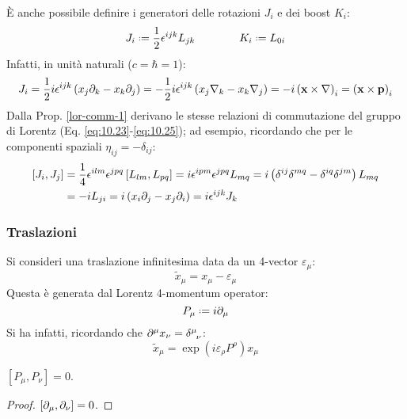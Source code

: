 È anche possibile definire i generatori delle rotazioni $ J_i $ e dei boost $ K_i $:
\begin{equation}
	J_i \defeq \frac{1}{2} \epsilon^{ijk} L_{jk}
	\qquad \qquad
	K_i \defeq L_{0i}
	\label{eq:10.35}
\end{equation}
Infatti, in unità naturali ($ c = \hbar = 1 $):
\begin{equation*}
	J_i = \frac{1}{2} i \epsilon^{ijk} \left( x_j \partial_k - x_k \partial_j \right) = -\frac{1}{2} i \epsilon^{ijk} \left( x_j \nabla_k - x_k \nabla_j \right) = -i \left( \mathbf{x} \times \nabla \right)_i = \left( \mathbf{x} \times \mathbf{p} \right)_i
\end{equation*}
Dalla Prop. \ref{lor-comm-1} derivano le stesse relazioni di commutazione del gruppo di Lorentz (Eq. \ref{eq:10.23}-\ref{eq:10.25}); ad esempio, ricordando che per le componenti spaziali $ \eta_{ij} = -\delta_{ij} $:
\begin{equation*}
	\begin{split}
		\left[ J_i,J_j \right]
		&= \frac{1}{4} \epsilon^{ilm} \epsilon^{jpq} \left[ L_{lm},L_{pq} \right] = i \epsilon^{ipm} \epsilon^{jpq} L_{mq} = i \left( \delta^{ij} \delta^{mq} - \delta^{iq} \delta^{jm} \right) L_{mq} \\
		&= -i L_{ji} = i \left( x_i \partial_j - x_j \partial_i \right) = i \epsilon^{ijk} J_k
	\end{split}
\end{equation*}

\subsubsection{Traslazioni}

Si consideri una traslazione infinitesima data da un 4-vector $ \varepsilon_{\mu} $:
\begin{equation*}
	\tilde{x}_{\mu} = x_{\mu} - \varepsilon_{\mu}
\end{equation*}
Questa è generata dal Lorentz 4-momentum operator:
\begin{equation}
	P_{\mu} \defeq i \pa_{\mu}
	\label{eq:10.36}
\end{equation}
Si ha infatti, ricordando che $ \pa^{\mu} x_{\nu} = \tensor{\delta}{^\mu_\nu} $:
\begin{equation}
	\tilde{x}_{\mu} = \exp \left( i \varepsilon_{\rho} P^{\rho} \right) x_{\mu}
	\label{eq:10.37}
\end{equation}

\begin{proposition}
	$ \left[ P_{\mu},P_{\nu} \right] = 0 $.
\end{proposition}
\begin{proof}
	$ \left[ \partial_{\mu},\partial_{\nu} \right] = 0 $.
\end{proof}

